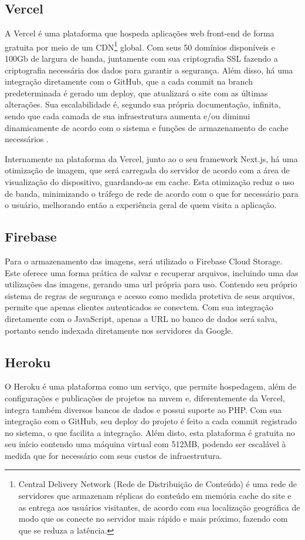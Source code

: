 \subsection{Vercel}
A Vercel é uma plataforma que hospeda aplicações web front-end de forma gratuita por meio de um CDN\footnote{Central Delivery Network (Rede de Distribuição de Conteúdo) é uma rede de servidores que armazenam réplicas do conteúdo em memória cache do site e as entrega aos usuários visitantes, de acordo com sua localização geográfica de modo que os conecte no servidor mais rápido e mais próximo, fazendo com que se reduza a latência.}
global. Com seus 50 domínios disponíveis e 100Gb de largura de banda, juntamente com sua criptografia SSL fazendo a criptografia necessária dos dados para garantir a segurança. Além disso, há uma integração diretamente com o GitHub, que a cada commit na branch predeterminada é gerado um deploy, que atualizará o site com as últimas alterações. Sua escalabilidade é, segundo sua própria documentação, infinita, sendo que cada camada de sua infraestrutura aumenta e/ou diminui dinamicamente de acordo com o sistema e funções de armazenamento de cache necessários \cite{VERCEL}. 

Internamente na plataforma da Vercel, junto ao o seu framework Next.js, há uma otimização de imagem, que será carregada do servidor de acordo com a área de visualização do dispositivo, guardando-as em cache. Esta otimização reduz o uso de banda, minimizando o tráfego de rede de acordo com o que for necessário para o usuário, melhorando então a experiência geral de quem visita a aplicação.

\subsection{Firebase}
Para o armazenamento das imagens, será utilizado o Firebase Cloud Storage. Este oferece uma forma prática de salvar e recuperar arquivos, incluindo uma das utilizações das imagens, gerando uma url própria para uso. Contendo seu próprio sistema de regras de segurança e acesso como medida protetiva de seus arquivos, permite que apenas clientes autenticados se conectem. Com sua integração diretamente com o JavaScript, apenas a URL no banco de dados será salva, portanto sendo indexada diretamente nos servidores da Google.\cite{FIREBASE}

\subsection{Heroku}
O Heroku é uma plataforma como um serviço, que permite hospedagem, além de configurações e publicações de projetos na nuvem e, diferentemente da Vercel, integra também diversos bancos de dados e possui suporte ao PHP. Com sua integração com o GitHub, seu deploy do projeto é feito a cada commit registrado no sistema, o que facilita a integração. Além disto, esta plataforma é gratuita no seu início contendo uma máquina virtual com 512MB, podendo ser escalável à medida que for necessário com seus custos de infraestrutura. 

